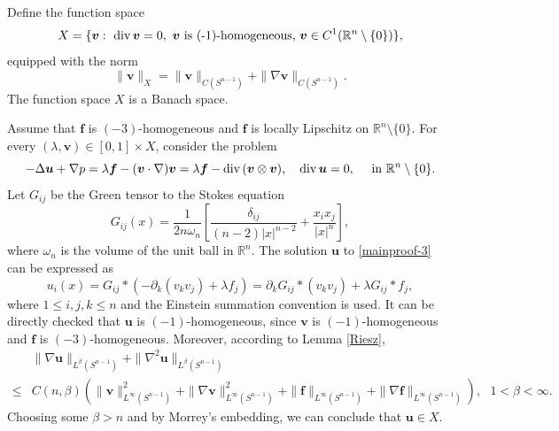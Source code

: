 \documentclass[12pt]{amsart}
\renewcommand{\div}{{\rm div \thinspace }}
\newcommand{\Bv}{{\boldsymbol{v}}}
\newcommand{\Bu}{{\boldsymbol{u}}}
\newcommand{\Bf}{{\boldsymbol{f}}}
\begin{document}
Define the function space 
\begin{equation}\label{eq:defofX}
	X=\{ \Bv:\ \div \Bv=0, \  \Bv \textrm{ is (-1)-homogeneous,} \ \Bv\in C^{1}(\mathbb{R}^n\setminus\{0\})\},
\end{equation}
equipped with the norm 
\begin{equation*}
	\|\Bv\|_{X}= \|\Bv\|_{C(S^{n-1})} + \|\nabla \Bv\|_{C(S^{n-1})}. 
\end{equation*}
The function space $X$ is a Banach space. 

Assume that $\Bf$ is $(-3)$-homogeneous and $\Bf$ is locally Lipschitz on $\mathbb{R}^n \setminus \{0\}$. For every $(\lambda, \Bv) \in [0, 1]\times X$, consider the problem 
\begin{equation}\label{mainproof-3}
	-\Delta \Bu + \nabla p = \lambda \Bf - (\Bv \cdot \nabla)\Bv = \lambda \Bf  - \div (\Bv \otimes \Bv), \ \ \ \div \Bu =0, \ \ \ \textrm{ in } \mathbb{R}^n \setminus \{0\}. 
\end{equation}
Let $G_{ij}$ be the Green tensor to the Stokes equation 
\begin{equation}\label{eq:Greentensor1}
	G_{ij}(x)= \frac{1}{2n\omega_n} \left[\frac{\delta_{ij}}{(n-2)|x|^{n-2}} +\frac{ x_i x_j}{|x|^n}\right],
\end{equation}
where $\omega_n$ is the volume of the unit ball in $\mathbb{R}^n$. 
The solution $\Bu$ to \eqref{mainproof-3} can be expressed as 
\begin{equation}\label{eq:soluformu1}
	u_i(x)=G_{ij}*( - \partial_k(v_k v_j)+ \lambda f_j) =  \partial_k G_{ij} * (v_k v_j) + \lambda G_{ij}*f_j,
\end{equation}
where $1\leq i,j,k \leq n$  and the Einstein summation convention is used. It can be directly checked that $\Bu$ is $(-1)$-homogeneous, since $\Bv$ is $(-1)$-homogeneous and  $\Bf$ is $(-3)$-homogeneous. Moreover, according to Lemma \ref{Riesz}, 
\begin{equation}\label{mainproof-6}
	\begin{aligned}
		& \|\nabla \Bu\|_{L^\beta(S^{n-1})} + \|\nabla^2 \Bu \|_{L^\beta(S^{n-1})} \\
		\leq&   C (n, \beta) \left( \|\Bv\|_{L^\infty(S^{n-1})}^2 + \|\nabla \Bv\|_{L^\infty(S^{n-1})}^2  +
		\|\Bf\|_{L^\infty(S^{n-1})} + \|\nabla \Bf\|_{L^\infty(S^{n-1})} \right), \ \ \ 1<\beta<\infty. 
	\end{aligned}
\end{equation}
Choosing some $\beta>n$ and by Morrey's embedding, we can conclude that $\Bu \in X$. 
\end{document}
